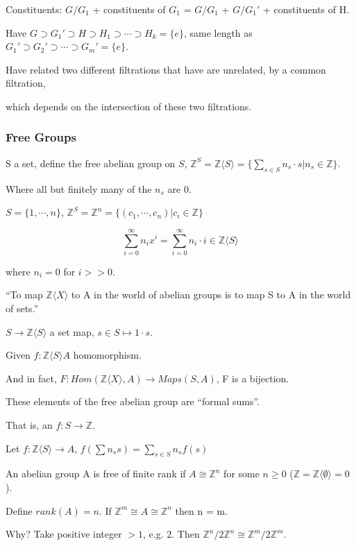 \documentclass[12pt]{article}
\begin{document}
Constituents: $G/G_1$ + constituents of $G_1$ = $G/G_1$ + $G/G_1'$ + constituents of H.

Have $G \supset G_1' \supset H \supset H_1 \supset \cdots \supset H_k = \{e\}$, same length as $G_1' \supset G_2' \supset \cdots \supset G_m' = \{e\}$.

Have related two different filtrations that have are unrelated, by a common filtration,

which depends on the intersection of these two filtrations.

\subsubsection{Free Groups}

\noindent
S a set, define the free abelian group on $S$, $\mathds{Z}^S = \mathds{Z}\langle S\rangle = \{\sum_{s \in S} n_s \cdot s | n_s \in \mathds{Z}\}$.

Where all but finitely many of the $n_s$ are 0.

$S = \{1, \cdots, n\}$, $\mathds{Z}^S = \mathds{Z}^n = \{(c_1, \cdots, c_n) | c_i \in \mathds{Z}\}$

$$\sum_{i = 0}^\infty n_i x^i = \sum_{i = 0}^\infty n_i \cdot i \in \mathds{Z}\langle S \rangle$$

where $n_i = 0$ for $i >> 0$.

\noindent
``To map $\mathds{Z}\langle X\rangle$ to A in the world of abelian groups is to map S to A in the world of sets.''

$S \to \mathds{Z}\langle S \rangle$ a set map, $s \in S \mapsto 1 \cdot s$.

Given $f: \mathds{Z} \langle S \rangle A$ homomorphism.

And in fact, $F: Hom(\mathds{Z} \langle X\rangle, A) \to Maps(S, A)$, F is a bijection.

\noindent
These elements of the free abelian group are ``formal sums''.

That is, an $f: S \to \mathds{Z}$.

\noindent
Let $f: \mathds{Z}\langle S\rangle \to A$, $f(\sum n_ss) = \sum_{s \in S}n_sf(s)$

\noindent
An abelian group A is free of finite rank if $A \cong \mathds{Z}^n$ for some $n \geq 0$ ($\mathds{Z} = \mathds{Z}\langle \emptyset \rangle = 0$).

Define $rank(A) = n$.  If $\mathds{Z}^m \cong A \cong \mathds{Z}^n$ then n = m.

Why? Take positive integer $> 1$, e.g. 2.  Then $\mathds{Z}^n/2\mathds{Z}^n \cong \mathds{Z}^m/2\mathds{Z}^m$.
\end{document}
